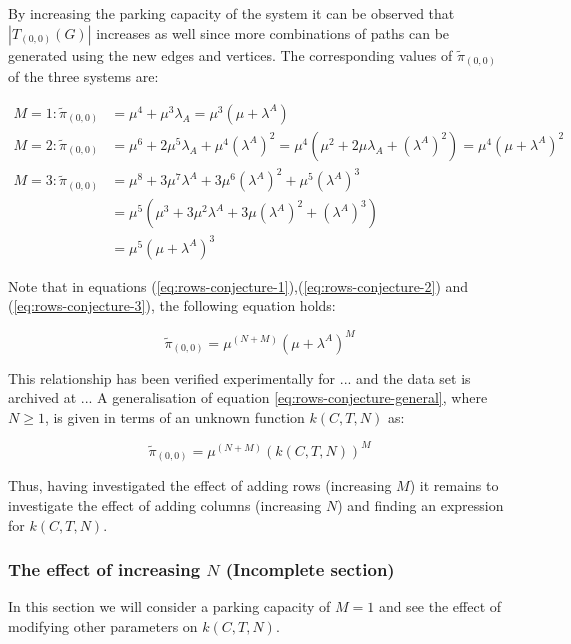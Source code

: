 By increasing the parking capacity of the system it can be observed that 
\(|T_{(0,0)}(G)|\) increases as well since more combinations of paths can be 
generated using the new edges and vertices. 
The corresponding values of \(\tilde{\pi}_{(0,0)}\) of the three systems are:

\begin{align}
    M = 1: \tilde{\pi}_{(0,0)} &= \mu^4 + \mu^3 \lambda_A = 
    \mu^3 (\mu + \lambda^A) \label{eq:rows-conjecture-1}\\
    M = 2: \tilde{\pi}_{(0,0)} &= \mu^6 + 2\mu^5 \lambda_A + \mu^4 (\lambda^A)^2 
    = \mu^4(\mu^2 + 2\mu \lambda_A + (\lambda^A)^2) 
    = \mu^4 (\mu + \lambda^A) ^ 2 \label{eq:rows-conjecture-2}\\
    M = 3: \tilde{\pi}_{(0,0)} &= \mu^8 + 3 \mu^7 \lambda^A + 
    3 \mu^6 (\lambda^A)^2 + \mu^5(\lambda^A)^3 \nonumber \\
    &= \mu^5 (\mu^3 + 3 \mu ^2 \lambda^A + 3 \mu (\lambda^A)^2 + (\lambda^A)^3) 
    \nonumber \\
    &= \mu^5 (\mu + \lambda^A) ^ 3 \label{eq:rows-conjecture-3}
\end{align}

Note that in equations (\ref{eq:rows-conjecture-1}),(\ref{eq:rows-conjecture-2}) 
and (\ref{eq:rows-conjecture-3}), the following equation holds: 

\begin{equation}\label{eq:rows-conjecture-general}
    \tilde{\pi}_{(0,0)} = \mu^{(N+M)} (\mu + \lambda^A)^M
\end{equation}

This relationship has been verified experimentally for ... and the data set is 
archived at ... 
A generalisation of equation \ref{eq:rows-conjecture-general}, where \(N \geq 1\), 
is given in terms of an unknown function \(k(C,T,N)\) as:

\begin{equation}
    \tilde{\pi}_{(0,0)} = \mu^{(N+M)} (k(C,T,N))^M
\end{equation}

Thus, having investigated the effect of adding rows (increasing \(M\)) it remains 
to investigate the effect of adding columns (increasing \(N\)) and finding an 
expression for \(k(C,T,N)\).

\subsubsection{The effect of increasing \(N\) (Incomplete section)}
In this section we will consider a parking capacity of \(M=1\) and see the effect 
of modifying other parameters on \(k(C, T, N)\).

